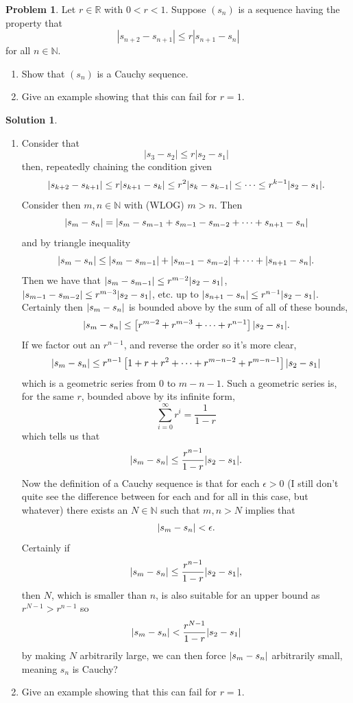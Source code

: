 \documentclass[10pt]{article}
\theoremstyle{definition}
\newtheorem{problem}{Problem}
\newtheorem{soln}{Solution}
\begin{document}
\begin{problem}
Let $r\in \mathbb{R}$ with $0 < r < 1$. Suppose $(s_n)$ is a sequence having the property
that
$$|s_{n+2} - s_{n+1}| \leq r|s_{n+1} - s_n|$$
for all $n \in\mathbb{N}$.
\begin{enumerate}[label=(\alph*)]
  \item Show that $(s_n)$ is a Cauchy sequence.
  \item Give an example showing that this can fail for $r = 1$.
\end{enumerate}
\end{problem}
\begin{soln}~
  \begin{enumerate}[label=(\alph*)]
    \item Consider that
          $$|s_{3} - s_{2}| \leq r|s_2 - s_1|$$
          then, repeatedly chaining the condition given
          $$|s_{k+2} - s_{k+1}| \leq r|s_{k+1} - s_k|\leq r^{2}|s_{k} - s_{k-1}|\leq\dots \leq r^{k-1}\abs{s_2 - s_1}.$$
          Consider then $m,n\in\mathbb{N}$ with (WLOG) $m>n$. Then
          $$\abs{s_m-s_n}=\abs{s_m-s_{m-1}+s_{m-1}-s_{m-2}+\dots+ s_{n+1}-s_n}$$
          and by triangle inequality
          $$\abs{s_m-s_n}\leq \abs{s_m-s_{m-1}}+\abs{s_{m-1}-s_{m-2}}+\dots+\abs{s_{n+1}-s_n}.$$
          Then we have that $\abs{s_m-s_{m-1}}\leq r^{m-2}\abs{s_2 - s_1}$, $\abs{s_{m-1}-s_{m-2}}\leq r^{m-3}\abs{s_2 - s_1}$,
          etc. up to $\abs{s_{n+1}-s_n}\leq r^{n-1}\abs{s_2 - s_1}$. Certainly then $\abs{s_m-s_n}$ is bounded above by the sum of all of
          these bounds,
          $$\abs{s_m-s_n}\leq \left[r^{m-2}+r^{m-3}+\dots+r^{n-1}\right]\abs{s_2 - s_1}.$$
          If we factor out an $r^{n-1}$, and reverse the order so it's more clear,
          $$\abs{s_m-s_n}\leq r^{n-1}\left[1+r+r^2+\dots+r^{m-n-2}+r^{m-n-1}\right]\abs{s_2 - s_1}$$
          which is a geometric series from $0$ to $m-n-1$. Such a geometric series is, for the same $r$, bounded above by its infinite form,
          $$\sum_{i=0}^{\infty}r^i=\frac{1}{1-r}$$
          which tells us that 
          $$\abs{s_m-s_n}\leq \frac{r^{n-1}}{1-r}\abs{s_2 - s_1}.$$
          Now the definition of a Cauchy sequence is that for each $\epsilon>0$ (I still don't quite see the difference between for each and for all in this case, but whatever)
          there exists an $N\in\mathbb{N}$ such that $m,n> N$ implies that 
          $$\abs{s_m-s_n}< \epsilon.$$
          Certainly if 
          $$\abs{s_m-s_n}\leq \frac{r^{n-1}}{1-r}\abs{s_2 - s_1},$$
          then $N$, which is smaller than $n$, is also suitable for an upper bound as $r^{N-1}>r^{n-1}$ so 
          $$\abs{s_m-s_n}<\frac{r^{N-1}}{1-r}\abs{s_2 - s_1}$$
          by making $N$ arbitrarily large, we can then force $\abs{s_m-s_n}$ arbitrarily small, meaning $s_n$ is Cauchy?
    \item Give an example showing that this can fail for $r = 1$.
  \end{enumerate}
\end{soln}
\end{document}
